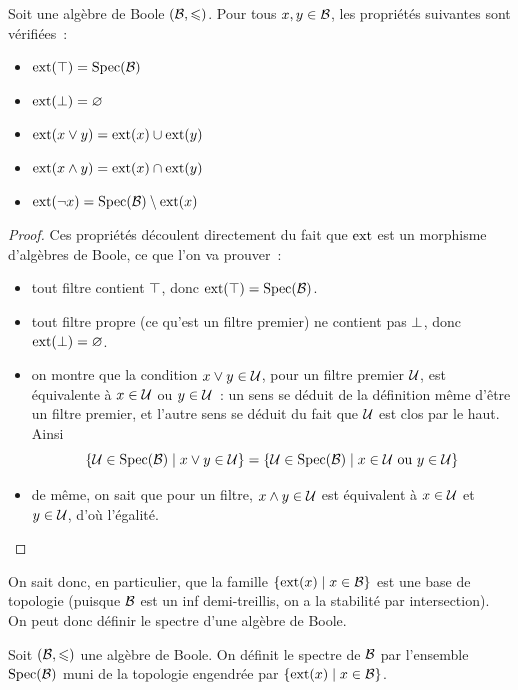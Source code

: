 \begin{property}
  Soit une algèbre de Boole $(\mathcal{B},\leqslant)$. Pour tous $x,y\in \mathcal{B}$, les
  propriétés suivantes sont vérifiées~:
  \begin{itemize}
  \item $\operatorname{ext}(\top) = \operatorname{Spec}(\mathcal{B})$
  \item $\operatorname{ext}(\bot) = \varnothing$
  \item $\operatorname{ext}(x\vee y) = \operatorname{ext}(x)\cup\operatorname{ext}(y)$
  \item $\operatorname{ext}(x\wedge y) = \operatorname{ext}(x)\cap\operatorname{ext}(y)$
  \item $\operatorname{ext}(\lnot x) = \operatorname{Spec}(\mathcal{B})\setminus\operatorname{ext}(x)$
  \end{itemize}
\end{property}

\begin{proof}
  Ces propriétés découlent directement du fait que $\operatorname{ext}$ est un morphisme
  d'algèbres de Boole, ce que l'on va prouver~:
  \begin{itemize}
  \item tout filtre contient $\top$, donc $\operatorname{ext}(\top) = \operatorname{Spec}(\mathcal{B})$.
  \item tout filtre propre (ce qu'est un filtre premier) ne contient pas $\bot$,
    donc $\operatorname{ext}(\bot) = \varnothing$.
  \item on montre que la condition $x\vee y \in \mathcal{U}$, pour un filtre
    premier $\mathcal{U}$, est équivalente à $x\in\mathcal{U}$ ou
    $y\in\mathcal{U}$~: un sens se déduit de la définition même d'être un filtre
    premier, et l'autre sens se déduit du fait que $\mathcal{U}$ est clos par le
    haut. Ainsi
    \[\left\{ \mathcal{U}\in\operatorname{Spec}(\mathcal{B}) \;\middle\vert\; x\vee y \in\mathcal{U} \right\} =
    \left\{ \mathcal{U}\in\operatorname{Spec}(\mathcal{B}) \;\middle\vert\; x\in\mathcal{U} \text{ ou } y\in\mathcal{U} \right\}\]
  \item de même, on sait que pour un filtre, $x\wedge y \in \mathcal{U}$ est
    équivalent à $x\in\mathcal{U}$ et $y\in\mathcal{U}$, d'où l'égalité.\qedhere
  \end{itemize}
\end{proof}

On sait donc, en particulier, que la famille $\left\{ \operatorname{ext}(x) \;\middle\vert\; x\in \mathcal{B} \right\}$
est une base de topologie (puisque $\mathcal{B}$ est un inf demi-treillis, on a la
stabilité par intersection). On peut donc définir le spectre d'une algèbre de
Boole.

\begin{definition}
  Soit $(\mathcal{B},\leqslant)$ une algèbre de Boole. On définit le spectre de $\mathcal{B}$
  par l'ensemble $\operatorname{Spec}(\mathcal{B})$ muni de la topologie engendrée par
  $\left\{ \operatorname{ext}(x) \;\middle\vert\; x \in \mathcal{B} \right\}$.
\end{definition}

